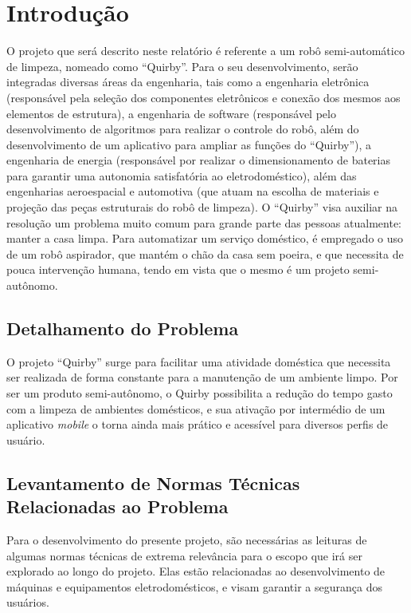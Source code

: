 \chapter[Introdução]{Introdução}

O projeto que será descrito neste relatório é referente a um robô semi-automático de limpeza, nomeado como “Quirby”. Para o seu desenvolvimento, serão integradas diversas áreas da engenharia, tais como a engenharia eletrônica (responsável pela seleção dos componentes eletrônicos e conexão dos mesmos aos elementos de estrutura), a engenharia de software (responsável pelo desenvolvimento de algoritmos para realizar o controle do robô, além do desenvolvimento de um aplicativo para ampliar as funções do “Quirby”), a engenharia de energia (responsável por realizar o dimensionamento de baterias para garantir uma autonomia satisfatória ao eletrodoméstico), além das engenharias aeroespacial e automotiva (que atuam na escolha de materiais e projeção das peças estruturais do robô de limpeza).
O “Quirby” visa auxiliar na resolução um problema muito comum para grande parte das pessoas atualmente: manter a casa limpa. Para automatizar um serviço doméstico, é empregado o uso de um robô aspirador, que mantém o chão da casa sem poeira, e que necessita de pouca intervenção humana, tendo em vista que o mesmo é um projeto semi-autônomo.


\section{Detalhamento do Problema}

O projeto “Quirby” surge para facilitar uma atividade doméstica que necessita ser realizada de forma constante para a manutenção de um ambiente limpo. Por ser um produto semi-autônomo, o Quirby possibilita a redução do tempo gasto com a limpeza de ambientes domésticos, e sua ativação por intermédio de um aplicativo \textit{mobile} o torna ainda mais prático e acessível para diversos perfis de usuário.

\section{Levantamento de Normas Técnicas Relacionadas ao Problema}
Para o desenvolvimento do presente projeto, são necessárias as leituras de algumas normas técnicas de extrema relevância para o escopo que irá ser explorado ao longo do projeto. Elas estão relacionadas ao desenvolvimento de máquinas e equipamentos eletrodomésticos, e visam garantir a segurança dos usuários.

